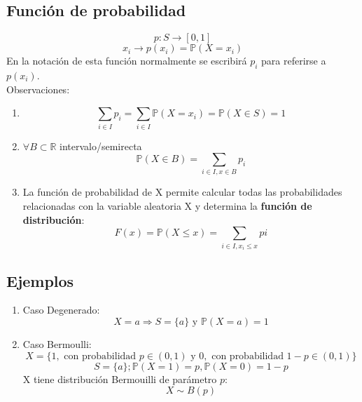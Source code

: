 \documentclass[11pt]{article}
\newcommand{\R}{\mathbb{R}}
\newcommand{\prob}{\mathbb{P}}
\theoremstyle{plain}
\begin{document}
        \subsection{Función de probabilidad} %
        \label{sub:función_de_probabilidad}
            \[p:S \rightarrow [0,1]\]
            \[x_i \rightarrow p(x_i) = \prob(X=x_i)\]
        En la notación de esta función normalmente se escribirá $p_i$ para referirse a $p(x_i)$.\\
        Observaciones:
        \begin{enumerate}[label=\Alph*]
            \item \[\sum_{i\in I} p_i = \sum_{i\in I} \prob(X = x_i) = \prob(X \in S) = 1\]
            \item $\forall B \subset \R$ intervalo/semirecta 
            \[\prob(X\in B) = \sum_{i\in I, x\in B} p_i\]
            \item La función de probabilidad de X permite calcular todas las probabilidades relacionadas con la variable aleatoria X y determina la \textbf{función de distribución}:
            \[F(x) = \prob(X\le x) = \sum_{i\in I, x_i \le x} pi\]
        \end{enumerate}
        \subsection{Ejemplos} %
        \label{sub:ejemplos}
            \begin{enumerate}
                \item Caso Degenerado: 
                \[X = a \Rightarrow S = \{a\} \text{ y } \prob(X=a) = 1\]
                \item Caso Bermoulli:
                \[X = \{1, \text{ con probabilidad }p\in(0,1)\text{ y } 0,\text{ con probabilidad } 1 -p\in(0,1) \}\]
                \[S = \{a\}; \prob(X=1) = p, \prob(X=0) = 1 - p \]
                X tiene distribución Bermouilli de parámetro $p$:
                \[X \sim B(p) \]
            \end{enumerate}
    
\end{document}
